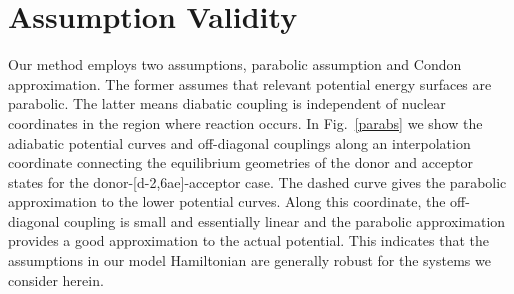 
\section{Assumption Validity}

Our method employs two assumptions, parabolic assumption and Condon approximation. The former assumes that relevant potential energy surfaces are parabolic. The latter means diabatic coupling  is independent of nuclear coordinates in the region where reaction occurs.
In Fig.~\ref{parabs} we show the adiabatic potential curves and off-diagonal couplings along an interpolation coordinate
connecting the equilibrium geometries of the donor and acceptor states for the donor-[d-2,6ae]-acceptor case.
The dashed curve gives the parabolic approximation to the
lower potential curves.  Along this coordinate, the off-diagonal coupling is small and essentially linear and the parabolic
approximation provides a good approximation to the actual potential.  This indicates that the assumptions in our model Hamiltonian
are generally robust for the systems we consider herein.

